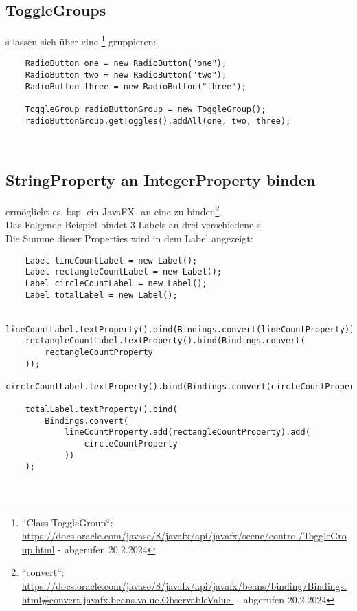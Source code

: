 \subsection*{ToggleGroups}
s lassen sich über eine \footnote{
``Class ToggleGroup``: \url{https://docs.oracle.com/javase/8/javafx/api/javafx/scene/control/ToggleGroup.html} - abgerufen 20.2.2024
} gruppieren:

\begin{verbatim}
    RadioButton one = new RadioButton("one");
    RadioButton two = new RadioButton("two");
    RadioButton three = new RadioButton("three");

    ToggleGroup radioButtonGroup = new ToggleGroup();
    radioButtonGroup.getToggles().addAll(one, two, three);
\end{verbatim}\\

\subsection*{StringProperty an IntegerProperty binden}

\begin{center}\end{center}
ermöglicht es, bsp. ein JavaFX- an eine  zu binden\footnote{
``convert``: \url{https://docs.oracle.com/javase/8/javafx/api/javafx/beans/binding/Bindings.html#convert-javafx.beans.value.ObservableValue-} - abgerufen 20.2.2024
}.\\

\noindent
Das Folgende Beispiel bindet 3 Labels an drei verschiedene s.\\
Die Summe dieser Properties wird in dem Label  angezeigt:
\begin{verbatim}
    Label lineCountLabel = new Label();
    Label rectangleCountLabel = new Label();
    Label circleCountLabel = new Label();
    Label totalLabel = new Label();

    lineCountLabel.textProperty().bind(Bindings.convert(lineCountProperty));
    rectangleCountLabel.textProperty().bind(Bindings.convert(
        rectangleCountProperty
    ));
    circleCountLabel.textProperty().bind(Bindings.convert(circleCountProperty));

    totalLabel.textProperty().bind(
        Bindings.convert(
            lineCountProperty.add(rectangleCountProperty).add(
                circleCountProperty
            ))
    );
\end{verbatim}\\

